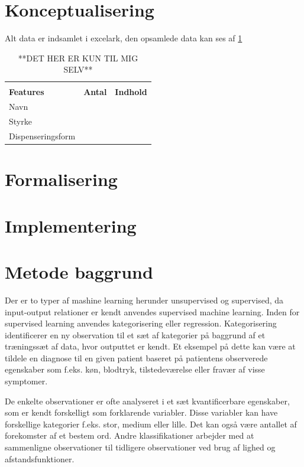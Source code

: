 \section{Konceptualisering}
Alt data er indsamlet i excelark, den opsamlede data kan ses af \ref{table:XXX}

\vspace{2mm}
\begin{longtable}{p{3cm}|p{1cm}|p{10cm}}
	\caption{**DET HER ER KUN TIL MIG SELV**}
	\vspace{2mm}
	\label{table:XXX} \\
\cellcolor[HTML]{C0C0C0} {\textbf{Features}} & {\cellcolor[HTML]{C0C0C0}\textbf{Antal}} & 
{\cellcolor[HTML]{C0C0C0}\textbf{Indhold}} \\ \hline
Navn &  & \\ \hline
Styrke & & \\ \hline
Dispenseringsform & &  \\ \hline
\end{longtable}


\section{Formalisering}


\section{Implementering}



\section{Metode baggrund}
Der er to typer af mashine learning herunder unsupervised og supervised, da input-output relationer er kendt anvendes supervised machine learning. Inden for supervised learning anvendes kategorisering eller regression. Kategorisering identificerer en ny observation til et sæt af kategorier på baggrund af et træningssæt af data, hvor outputtet er kendt. Et eksempel på dette kan være at tildele en diagnose til en given patient baseret på patientens observerede egenskaber som f.eks. køn, blodtryk, tilstedeværelse eller fravær af visse symptomer. 

De enkelte observationer er ofte analyseret i et sæt kvantificerbare egenskaber, som er kendt forskelligt som forklarende variabler. Disse variabler kan have forskellige kategorier f.eks. stor, medium eller lille. Det kan også være antallet af forekomster af et  bestem ord. Andre klassifikationer arbejder med at sammenligne observationer til tidligere observationer ved brug af lighed og afstandsfunktioner.

